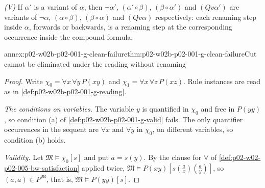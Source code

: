 \emph{(V)} If \(\alpha'\) is a variant of \(\alpha\), then \(\neg\alpha'\),
\((\alpha'\circ\beta)\), \((\beta\circ\alpha')\) and \((Qv\alpha')\) are
variants of \(\neg\alpha\), \((\alpha\circ\beta)\), \((\beta\circ\alpha)\) and
\((Qv\alpha)\) respectively: each renaming step inside \(\alpha\), forwards
or backwards, is a renaming step at the corresponding occurrence inside the
compound formula.

\begin{annexitem}{annex:p02-w02b-p02-001-g-clean-failure}{thm:p02-w02b-p02-001-g-clean-failure}{Cut cannot be eliminated under the reading without renaming}
\begin{proof}
Write \(\chi_0=\forall x\,\forall y\,P(xy)\) and
\(\chi_1=\forall x\,\forall z\,P(xz)\).  Rule instances are read as in
\cref{def:p02-w02b-p02-001-g-reading}.

\emph{The conditions on variables.}  The variable \(y\) is quantified in
\(\chi_0\) and free in \(P(yy)\), so condition (a) of
\cref{def:p02-w02b-p02-001-g-valid} fails.  The only quantifier occurrences
in the sequent are \(\forall x\) and \(\forall y\) in \(\chi_0\), on
different variables, so condition (b) holds.

\emph{Validity.}  Let \(\mathfrak M\models\chi_0[s]\) and put
\(a=s(y)\).  By the clause for \(\forall\) of
\cref{def:p02-w02-p02-005-bw-satisfaction} applied twice,
\(\mathfrak M\models P(xy)[s(\tfrac ax)(\tfrac ay)]\), so
\((a,a)\in P^{\mathfrak M}\), that is, \(\mathfrak M\models P(yy)[s]\).


\end{proof}
\end{annexitem}
